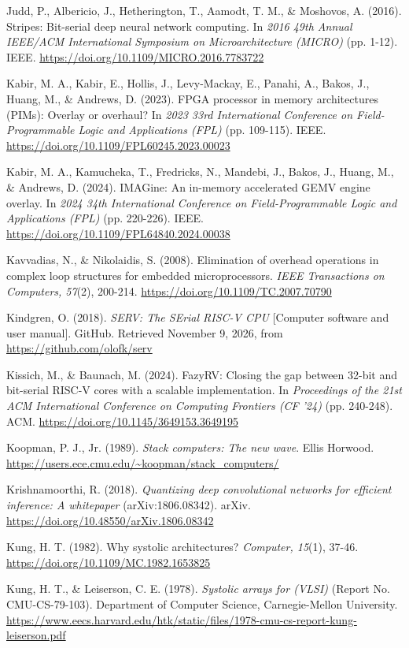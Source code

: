 \begin{apareferences}
Judd, P., Albericio, J., Hetherington, T., Aamodt, T. M., \& Moshovos, A. (2016). Stripes: Bit-serial deep neural network computing. In \emph{2016 49th Annual IEEE/ACM International Symposium on Microarchitecture (MICRO)} (pp. 1-12). IEEE. \url{https://doi.org/10.1109/MICRO.2016.7783722}

Kabir, M. A., Kabir, E., Hollis, J., Levy-Mackay, E., Panahi, A., Bakos, J., Huang, M., \& Andrews, D. (2023). FPGA processor in memory architectures (PIMs): Overlay or overhaul? In \emph{2023 33rd International Conference on Field-Programmable Logic and Applications (FPL)} (pp. 109-115). IEEE. \url{https://doi.org/10.1109/FPL60245.2023.00023}

Kabir, M. A., Kamucheka, T., Fredricks, N., Mandebi, J., Bakos, J., Huang, M., \& Andrews, D. (2024). IMAGine: An in-memory accelerated GEMV engine overlay. In \emph{2024 34th International Conference on Field-Programmable Logic and Applications (FPL)} (pp. 220-226). IEEE. \url{https://doi.org/10.1109/FPL64840.2024.00038}

Kavvadias, N., \& Nikolaidis, S. (2008). Elimination of overhead operations in complex loop structures for embedded microprocessors. \emph{IEEE Transactions on Computers, 57}(2), 200-214. \url{https://doi.org/10.1109/TC.2007.70790}

Kindgren, O. (2018). \emph{SERV: The SErial RISC-V CPU} {[}Computer software and user manual{]}. GitHub. Retrieved November 9, 2026, from \url{https://github.com/olofk/serv}

Kissich, M., \& Baunach, M. (2024). FazyRV: Closing the gap between 32-bit and bit-serial RISC-V cores with a scalable implementation. In \emph{Proceedings of the 21st ACM International Conference on Computing Frontiers (CF '24)} (pp. 240-248). ACM. \url{https://doi.org/10.1145/3649153.3649195}

Koopman, P. J., Jr. (1989). \emph{Stack computers: The new wave}. Ellis Horwood. \url{https://users.ece.cmu.edu/~koopman/stack_computers/}

Krishnamoorthi, R. (2018). \emph{Quantizing deep convolutional networks for efficient inference: A whitepaper} (arXiv:1806.08342). arXiv. \url{https://doi.org/10.48550/arXiv.1806.08342}

Kung, H. T. (1982). Why systolic architectures? \emph{Computer, 15}(1), 37-46. \url{https://doi.org/10.1109/MC.1982.1653825}

Kung, H. T., \& Leiserson, C. E. (1978). \emph{Systolic arrays for (VLSI)} (Report No. CMU-CS-79-103). Department of Computer Science, Carnegie-Mellon University. \url{https://www.eecs.harvard.edu/htk/static/files/1978-cmu-cs-report-kung-leiserson.pdf}


\end{apareferences}
